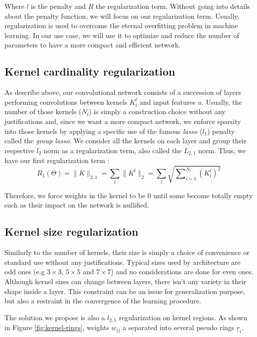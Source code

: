 \documentclass{winnower}
\begin{document}
Where $l$ is the penalty and $R$ the regularization term. Without going into details about the penalty function, we will focus on our regularization term. Usually, regularization is used to overcome the eternal overfitting problem in machine learning. In our use case, we will use it to optimize and reduce the number of parameters to have a more compact and  efficient network.

\subsection{Kernel cardinality regularization}

As describe above, our convolutional network consists of a succession of layers performing convolutions between kernels $K_i^l$ and input features $u$. Usually, the number of those kernels ($N_l$) is simply a construction choice without any justifications and, since we want a more compact network, we enforce sparsity into those kernels by applying a specific use of the famous \textit{lasso} ($l_1$) penalty called the \textit{group lasso}. We consider all the kernels on each layer and group their respective $l_2$ norm as a regularization term, also called the $L_{2,1}$ norm. Thus, we have our first regularization term :
\[
	R_1(\Theta) = \|K\|_{2,1} = \sum_l \|K^l\|_2 = \sum_l\sqrt{\sum\nolimits_{i = 1}^{N_l} (K_i^l)^2}
\] 

Therefore, we force weights in the kernel to be 0 until some become totally empty such as their impact on the network is nullified.

\subsection{Kernel size regularization }

Similarly to the number of kernels, their size is simply a choice of convenience or standard use without any justifications. Typical sizes used by architecture are odd ones (e.g $3 \times 3$, $5 \times 5$ and $7 \times 7$) and no considerations are done for even ones. Although kernel sizes can change between layers, there isn't any variety in their shape inside a layer. This constraint can be an issue for generalization purpose, but also a restraint in the convergence of the learning procedure.

The solution we propose is also a $l_{2,1}$ regularization on kernel regions. As shown in Figure \ref{fig:kernel-rings}, weights $w_{ij}$ a separated into several pseudo rings $\underline{r}_i$.
\end{document}
